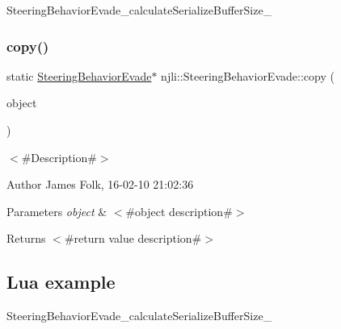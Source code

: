 \begin{DoxyCodeInclude}
\end{DoxyCodeInclude}
Steering\+Behavior\+Evade\+\_\+calculate\+Serialize\+Buffer\+Size\+\_\+ \mbox{\label{classnjli_1_1_steering_behavior_evade_a8795aeeb2da4b641b3cab466a569c689}} 
\subsubsection{\texorpdfstring{copy()}{copy()}}
{\footnotesize\ttfamily static \mbox{\hyperlink{classnjli_1_1_steering_behavior_evade}{Steering\+Behavior\+Evade}}$\ast$ njli\+::\+Steering\+Behavior\+Evade\+::copy (\begin{DoxyParamCaption}\item[{const \mbox{\hyperlink{classnjli_1_1_steering_behavior_evade}{Steering\+Behavior\+Evade}} \&}]{object }\end{DoxyParamCaption})\hspace{0.3cm}{\ttfamily [static]}}



$<$\#\+Description\#$>$ 

\begin{DoxyAuthor}{Author}
James Folk, 16-\/02-\/10 21\+:02\+:36
\end{DoxyAuthor}

\begin{DoxyParams}{Parameters}
{\em object} & $<$\#object description\#$>$\\
\hline
\end{DoxyParams}
\begin{DoxyReturn}{Returns}
$<$\#return value description\#$>$
\end{DoxyReturn}
\hypertarget{classnjli_1_1_steering_behavior_wander_ex1}{}\subsection{Lua example}\label{classnjli_1_1_steering_behavior_wander_ex1}

\begin{DoxyCodeInclude}
\end{DoxyCodeInclude}
Steering\+Behavior\+Evade\+\_\+calculate\+Serialize\+Buffer\+Size\+\_\+ \mbox{\label{classnjli_1_1_steering_behavior_evade_ad247df2ce7f2aec0dd3a795b45bef690}} 
